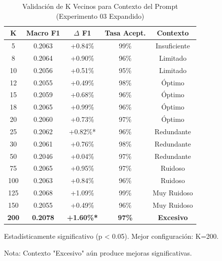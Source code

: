\begin{table}[htbp]
\centering
\caption{Validación de K Vecinos para Contexto del Prompt (Experimento 03 Expandido)}
\label{tab:k_neighbors_expanded}
\begin{tabular}{ccccc}
\toprule
\textbf{K} & \textbf{Macro F1} & \textbf{$\Delta$ F1} & \textbf{Tasa Acept.} & \textbf{Contexto} \\
\midrule
5   & 0.2063 & +0.84\% & 99\% & Insuficiente \\
8   & 0.2064 & +0.90\% & 96\% & Limitado \\
10  & 0.2056 & +0.51\% & 95\% & Limitado \\
12  & 0.2055 & +0.49\% & 98\% & Óptimo \\
15  & 0.2059 & +0.68\% & 96\% & Óptimo \\
18  & 0.2065 & +0.99\% & 96\% & Óptimo \\
20  & 0.2060 & +0.73\% & 97\% & Óptimo \\
25  & 0.2062 & +0.82\%* & 96\% & Redundante \\
30  & 0.2061 & +0.76\% & 98\% & Redundante \\
50  & 0.2046 & +0.04\% & 97\% & Redundante \\
75  & 0.2065 & +0.95\% & 97\% & Ruidoso \\
100 & 0.2063 & +0.84\% & 96\% & Ruidoso \\
125 & 0.2068 & +1.09\% & 99\% & Muy Ruidoso \\
150 & 0.2055 & +0.49\% & 96\% & Muy Ruidoso \\
\rowcolor{green!20}
\textbf{200} & \textbf{0.2078} & \textbf{+1.60\%*} & \textbf{97\%} & \textbf{Excesivo} \\
\bottomrule
\end{tabular}
\begin{tablenotes}
\small
\item * Estadísticamente significativo (p < 0.05). Mejor configuración: K=200.
\item Nota: Contexto "Excesivo" aún produce mejoras significativas.
\end{tablenotes}
\end{table}
